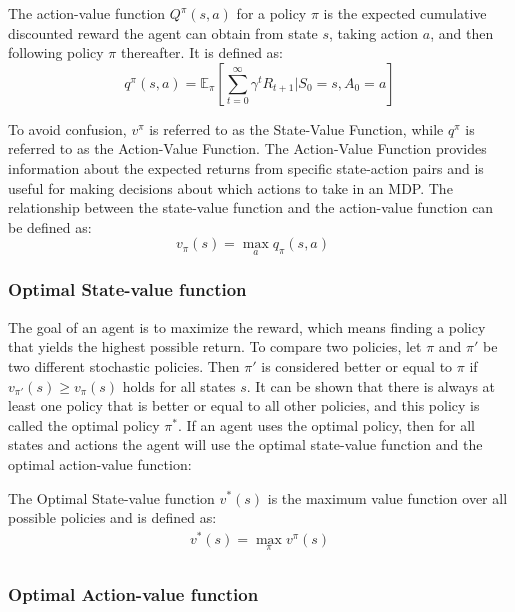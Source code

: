\documentclass[../xlapes02]{subfiles}
\begin{document}
    \begin{definition}
        The action-value function $Q^{\pi}(s, a)$ for a policy $\pi$ is the expected cumulative discounted reward the agent can obtain from state $s$, taking action $a$, and then following policy $\pi$ thereafter. It is defined as:
        \[
            q^{\pi}(s, a) = \mathbb{E}_{\pi}\left[\sum_{t=0}^{\infty} \gamma^t R_{t+1} | S_0 = s, A_0 = a\right]
        \]
    \end{definition}

    To avoid confusion, $v^\pi$ is referred to as the State-Value Function, while $q^\pi$ is referred to as the Action-Value Function. The Action-Value Function provides information about the expected returns from specific state-action pairs and is useful for making decisions about which actions to take in an MDP. The relationship between the state-value function and the action-value function can be defined as:
    \[ v_\pi(s) = \max_a q_\pi(s, a) \quad\]

    \subsubsection{Optimal State-value function}
    The goal of an agent is to maximize the reward, which means finding a policy that yields the highest possible return. To compare two policies, let $\pi$ and $\pi'$ be two different stochastic policies. Then $\pi'$ is considered better or equal to $\pi$ if $v_{\pi'}(s) \geq v_{\pi}(s)$ holds for all states $s$. It can be shown that there is always at least one policy that is better or equal to all other policies, and this policy is called the optimal policy $\pi^*$. If an agent uses the optimal policy, then for all states and actions the agent will use the optimal state-value function and the optimal action-value function:
    \begin{definition}
        The Optimal State-value function $v^*(s)$ is the maximum value function over all possible policies and is defined as:
        \begin{equation}
            \begin{split}
                v^*(s) = \max_{\pi} v^{\pi}(s) \\
            \end{split}
        \end{equation}
    \end{definition}

    \subsubsection{Optimal Action-value function}
\end{document}
